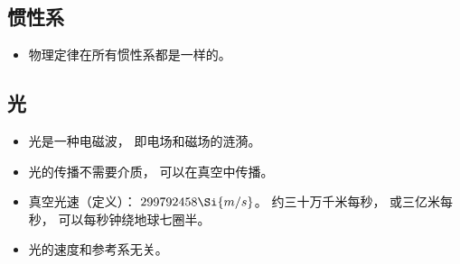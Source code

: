 
\begin{issues}
\issueDraft
\end{issues}

\subsection{惯性系}
\begin{itemize}
\item 物理定律在所有惯性系都是一样的。
\end{itemize}

\subsection{光}
\begin{itemize}
\item 光是一种电磁波， 即电场和磁场的涟漪。
\item 光的传播不需要介质， 可以在真空中传播。
\item 真空光速（定义）： $299792458\Si{m/s}$。 约三十万千米每秒， 或三亿米每秒， 可以每秒钟绕地球七圈半。
\item 光的速度和参考系无关。
\end{itemize}
